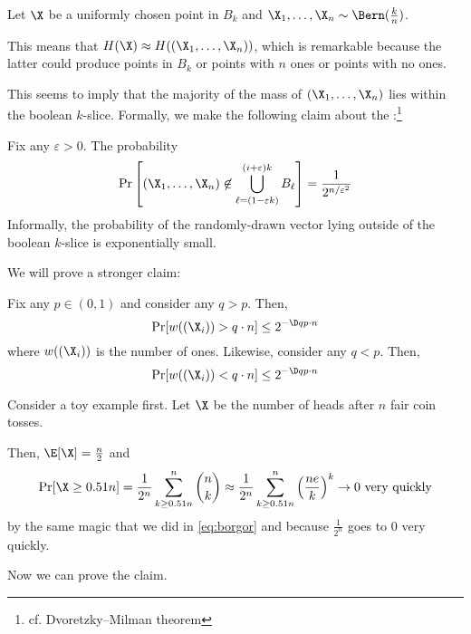 \documentclass[class=co432,notes,tikz]{agony}
\begin{document}
Let $\X$ be a uniformly chosen point in $B_k$
and $\X_1,\dotsc,\X_n \sim \Bern(\frac{k}{n})$.

This means that $H(\X) \approx H((\X_1,\dotsc,\X_n))$,
which is remarkable because the latter could produce points in $B_k$
or points with $n$ ones or points with no ones.

This seems to imply that the majority of the mass of $(\X_1,\dotsc,\X_n)$
lies within the boolean $k$-slice.
Formally, we make the following claim about the
:\footnote{cf. Dvoretzky--Milman theorem}

\begin{prop}
  Fix any $\varepsilon > 0$. The probability
  \[ \Pr\qty[(\X_1,\dotsc,\X_n) \not\in \bigcup_{\ell = (1-\varepsilon k)}^{(i+\varepsilon)k}B_\ell] = \frac{1}{2^{n/\varepsilon^2}} \]
  Informally, the probability of the randomly-drawn vector lying outside of
  the boolean $k$-slice is exponentially small.
\end{prop}

We will prove a stronger claim:

\begin{claim}
  Fix any $p \in (0,1)$ and consider any $q > p$. Then,
  \[ \Pr[w((\X_i)) > q \cdot n] \leq 2^{-\D q p \cdot n} \]
  where $w((\X_i))$ is the number of ones. Likewise, consider any $q < p$. Then,
  \[ \Pr[w((\X_i)) < q \cdot n] \leq 2^{-\D q p \cdot n} \]
\end{claim}

Consider a toy example first.
Let $\X$ be the number of heads after $n$ fair coin tosses.

Then, $\E[\X] = \frac{n}{2}$ and
\[
  \Pr[\X \geq 0.51n]
  = \frac{1}{2^n}\sum_{k\geq0.51n}^n\binom{n}{k}
  \approx \frac{1}{2^n}\sum_{k\geq0.51n}^n\qty(\frac{ne}{k})^k
  \to 0 \text{ very quickly}
\]
by the same magic that we did in \cref{eq:borgor}
and because $\frac{1}{2^n}$ goes to 0 very quickly.

Now we can prove the claim.
\end{document}
